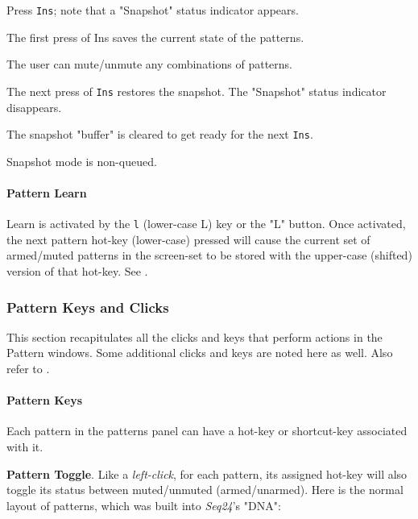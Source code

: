    \begin{enumber}
      \item Press \texttt{Ins}; note that a "Snapshot" status indicator appears.
      \item The first press of Ins saves the current state of the patterns.
      \item The user can mute/unmute any combinations of patterns.
      \item The next press of \texttt{Ins} restores the snapshot.
         The "Snapshot" status indicator disappears.
      \item The snapshot "buffer" is cleared to get ready for the next
         \texttt{Ins}.
      \item Snapshot mode is non-queued.
   \end{enumber}

\paragraph{Pattern Learn}
\label{paragraph:patterns_pattern_learn}

   Learn is activated by the \texttt{l} (lower-case L) key or the "L"
   button.
   Once activated, the next pattern hot-key (lower-case) pressed will
   cause the current set of armed/muted patterns in the screen-set to be
   stored with the upper-case (shifted) version of that hot-key.
   See .

\subsubsection{Pattern Keys and Clicks}
\label{subsubsec:patterns_pattern_keys_and_clicks}

   This section recapitulates all the clicks and keys that perform actions
   in the Pattern windows.  Some additional clicks and keys are noted here
   as well.
   Also refer to .

\paragraph{Pattern Keys}
\label{paragraph:patterns_pattern_keys}

   Each pattern in the patterns panel can have a hot-key or shortcut-key
   associated with it.

   \textbf{Pattern Toggle}.
   Like a \textsl{left-click}, for each pattern, its assigned hot-key will
   also toggle its status between muted/unmuted (armed/unarmed).
   Here is the normal layout of patterns, which was built into
   \textsl{Seq24}'s "DNA":

